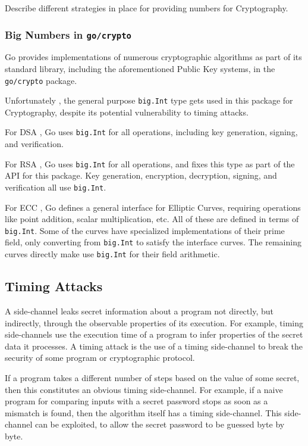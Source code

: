\documentclass[11pt, a4paper]{article} %
\begin{document}
{Describe different strategies in place for providing numbers for
Cryptography.

\subsubsection{Big Numbers in \texttt{go/crypto}}

Go \cite{the_go_authors_go_nodate} provides implementations of numerous
cryptographic algorithms as part of its standard library,
including the aforementioned Public Key systems, in the
\texttt{go/crypto} package.

Unfortunately \cite{ford_proposal_2017}, the general purpose
\texttt{big.Int} type gets used in this package for Cryptography,
despite its potential vulnerability to timing attacks.

For DSA \cite{technology_digital_1994}, Go uses \texttt{big.Int}
for all operations, including key generation, signing, and verification.

For RSA \cite{rivest_method_1978}, Go uses \texttt{big.Int}
for all operations, and fixes this type as part of the API for
this package. Key generation, encryption, decryption, signing,
and verification all use \texttt{big.Int}.

For ECC \cite{miller_use_1986}, Go defines a general interface
for Elliptic Curves, requiring operations like point addition,
scalar multiplication, etc. All of these are defined in terms
of \texttt{big.Int}. Some of the curves have specialized
implementations of their prime field, only converting from
\texttt{big.Int} to satisfy the interface curves. The remaining curves
directly make use \texttt{big.Int} for their field arithmetic.

\subsection{Timing Attacks}

A side-channel
\cite{kelsey_side_1998}
leaks secret information about a program not directly,
but indirectly, through the observable properties of its execution.
For example, timing side-channels use the execution time of a program
to infer properties of the secret data it processes. 
A timing attack is the use of a timing side-channel to break the security
of some program or cryptographic protocol.

If a program takes a different number of steps based on the value of some
secret, then this constitutes an obvious timing side-channel.
For example, if a naive program for comparing inputs with a secret password
stops as soon as a mismatch is found, then the algorithm itself has
a timing side-channel. This side-channel can be exploited, to allow
the secret password to be guessed byte by byte.

}
\end{document}
